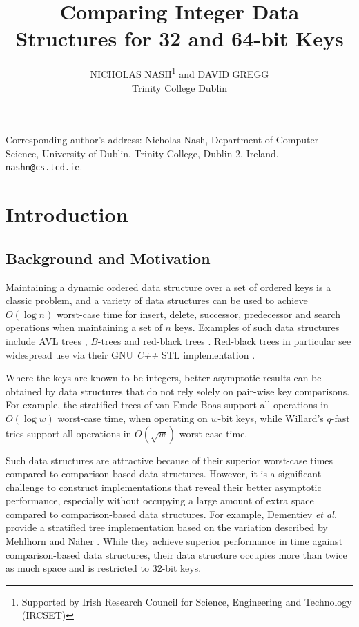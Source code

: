 \documentclass[]{acmtrans2m}
\title{Comparing Integer Data Structures for 32 and 64-bit Keys}
\author{
NICHOLAS NASH\footnote{Supported by Irish Research Council for Science, Engineering and Technology (IRCSET)} and DAVID GREGG\\
Trinity College Dublin
}
\begin{document}
\maketitle

\begin{bottomstuff}
Corresponding author's address: Nicholas Nash, Department of Computer
Science, University of Dublin, Trinity College, Dublin 2, Ireland. \texttt{nashn@cs.tcd.ie}.
\end{bottomstuff}

\section{Introduction}

\subsection{Background and Motivation}

Maintaining a dynamic ordered data structure over a set of
ordered keys is a classic problem, and a variety of data
structures can be used to achieve $O(\log n)$ worst-case time
for insert, delete, successor, predecessor
and search operations when maintaining a set of $n$ keys. Examples
of such data structures include AVL trees \cite{Knuth98}, $B$-trees \cite{BayerMcCreight72,Knuth98} 
and red-black trees \cite{Cormen+01}. Red-black trees in particular see widespread use via
their GNU \textsl{C++} STL implementation \cite{Stroustrup97}.

Where the keys are known to be integers,
better asymptotic results can be obtained by data structures that do not rely solely on pair-wise key comparisons. For example,
the stratified trees of van Emde Boas \citeyear{vanEmdeBoas77} support all operations
in $O(\log w)$ worst-case time, when operating on $w$-bit keys, while
Willard's $q$-fast tries \citeyear{Willard84} support all operations in $O(\sqrt{w})$ 
worst-case time. 

Such data structures are attractive because of their superior
worst-case times compared to comparison-based data structures.
However, it is a significant challenge to construct implementations 
that reveal their better asymptotic performance, especially without occupying 
a large amount of extra space compared to comparison-based data structures.
For example, Dementiev \textit{et al.} \citeyear{Dementiev+04} provide a stratified tree implementation based 
on the variation described by Mehlhorn and N\"aher \citeyear{MehlhornNaher90}. While
they achieve superior performance in time against comparison-based data structures, their
data structure occupies more than twice as much space and is restricted to 32-bit keys.
\end{document}
